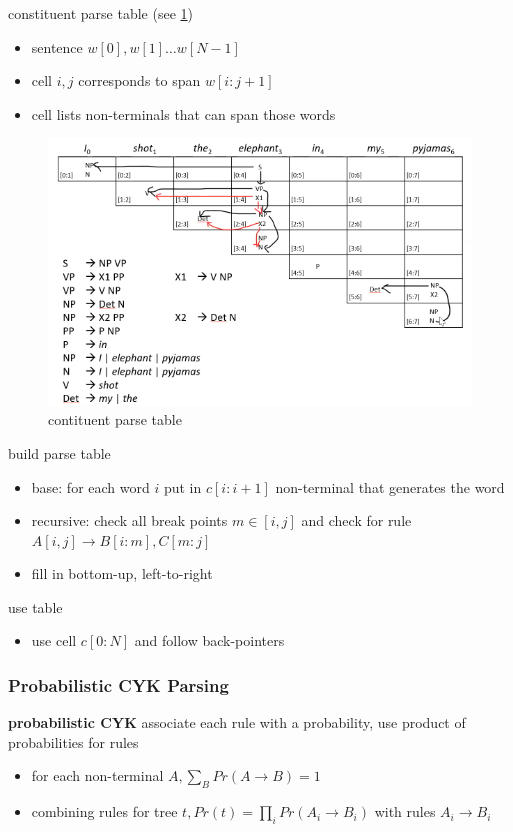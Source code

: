 \documentclass[]{article}
\theoremstyle{definition}
\begin{document}
constituent parse table (see \ref{fig:parse-table})
\begin{itemize}
    \item sentence $w[0], w[1] \ldots w[N-1]$
    \item cell $i,j$ corresponds to span $w[i:j+1]$
    \item cell lists non-terminals that can span those words
\end{itemize}

\begin{figure}[ht]
    \centering
    \includegraphics[width=0.7\linewidth]{comp550/parse-table.png}
    \caption{contituent parse table}%
    \label{fig:parse-table}
\end{figure}

build parse table
\begin{itemize}
    \item base: for each word $i$ put in $c[i:i+1]$ non-terminal that generates the word
    \item recursive: check all break points $m \in [i,j]$ and check for rule $A[i,j] \to B[i:m],C[m:j]$
    \item fill in bottom-up, left-to-right
\end{itemize}

use table
\begin{itemize}
    \item use cell $c[0:N]$ and follow back-pointers
\end{itemize}

\subsubsection{Probabilistic CYK Parsing}%
\label{ssub:probabilistic_cyk_parsing}

\textbf{probabilistic CYK} associate each rule with a probability, use product of probabilities for rules
\begin{itemize}
    \item for each non-terminal $A, \sum_B Pr(A \to B) = 1$
    \item combining rules for tree  $t, Pr(t) = \prod_i Pr(A_i \to B_i)$ with rules $A_i \to B_i$
\end{itemize}
\end{document}
